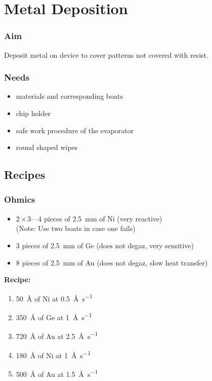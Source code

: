 \section{Metal Deposition}
\subsubsection{Aim}
Deposit metal on device to cover patterns not covered with resist.

\subsubsection{Needs}
\begin{itemize}[noitemsep]
  \item materials and corresponding boats
  \item chip holder
  \item safe work procedure of the evaporator
  \item round shaped wipes
\end{itemize}

\newpage

\subsection{Recipes}

\subsubsection{Ohmics}
\begin{itemize}
\item $2 \times 3\text{---}4$ pieces of \SI{2.5}{\milli\meter} of Ni (very reactive)\\
  (Note: Use two boats in case one fails)
\item 3 pieces of \SI{2.5}{\milli\meter} of Ge (does not degaz, very sensitive)
\item 8 pieces of \SI{2.5}{\milli\meter} of Au (does not degaz, slow heat transfer)
\end{itemize}

\textbf{Recipe: }
\begin{enumerate}[label=\protect\nth{\value*} layer: ,noitemsep,leftmargin=10em]
\item \SI{50}{\angstrom} of Ni at \SI{0.5}{\angstrom\per\second} 
\item \SI{350}{\angstrom} of Ge at \SI{1}{\angstrom\per\second} 
\item \SI{720}{\angstrom} of Au at \SI{2.5}{\angstrom\per\second} 
\item \SI{180}{\angstrom} of Ni at \SI{1}{\angstrom\per\second} 
\item \SI{500}{\angstrom} of Au at \SI{1.5}{\angstrom\per\second} 
\end{enumerate}


